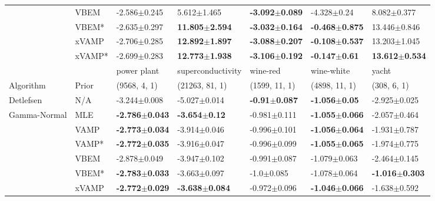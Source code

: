 \begin{tabular}{lllllll}
                 & VBEM &          -2.586$\pm$0.245 &            5.612$\pm$1.465 &  \textbf{-3.092$\pm$0.089} &            -4.328$\pm$0.24 &            8.082$\pm$0.377 \\
                 & VBEM* &          -2.635$\pm$0.297 &  \textbf{11.805$\pm$2.594} &  \textbf{-3.032$\pm$0.164} &  \textbf{-0.468$\pm$0.875} &           13.446$\pm$0.846 \\
                 & xVAMP &          -2.706$\pm$0.285 &  \textbf{12.892$\pm$1.897} &  \textbf{-3.088$\pm$0.207} &  \textbf{-0.108$\pm$0.537} &           13.203$\pm$1.045 \\
                 & xVAMP* &          -2.699$\pm$0.283 &  \textbf{12.773$\pm$1.938} &  \textbf{-3.106$\pm$0.192} &   \textbf{-0.147$\pm$0.61} &  \textbf{13.612$\pm$0.534} \\
\midrule
                 &        &                power plant &          superconductivity &                   wine-red &                 wine-white &                      yacht \\
Algorithm & Prior& (9568, 4, 1)& (21263, 81, 1)& (1599, 11, 1)& (4898, 11, 1)& (308, 6, 1)\\
\midrule
Detlefsen & N/A &           -3.244$\pm$0.008 &           -5.027$\pm$0.014 &   \textbf{-0.91$\pm$0.087} &   \textbf{-1.056$\pm$0.05} &           -2.925$\pm$0.025 \\
Gamma-Normal & MLE &  \textbf{-2.786$\pm$0.043} &   \textbf{-3.654$\pm$0.12} &           -0.981$\pm$0.111 &  \textbf{-1.055$\pm$0.066} &           -2.057$\pm$0.464 \\
                 & VAMP &  \textbf{-2.773$\pm$0.034} &           -3.914$\pm$0.046 &           -0.996$\pm$0.101 &  \textbf{-1.056$\pm$0.064} &           -1.931$\pm$0.787 \\
                 & VAMP* &  \textbf{-2.772$\pm$0.035} &           -3.916$\pm$0.047 &           -0.996$\pm$0.099 &  \textbf{-1.055$\pm$0.065} &           -1.974$\pm$0.775 \\
                 & VBEM &           -2.878$\pm$0.049 &           -3.947$\pm$0.102 &           -0.991$\pm$0.087 &           -1.079$\pm$0.063 &           -2.464$\pm$0.145 \\
                 & VBEM* &  \textbf{-2.783$\pm$0.033} &           -3.663$\pm$0.097 &             -1.0$\pm$0.085 &           -1.078$\pm$0.064 &  \textbf{-1.016$\pm$0.303} \\
                 & xVAMP &  \textbf{-2.772$\pm$0.029} &  \textbf{-3.638$\pm$0.084} &           -0.972$\pm$0.096 &  \textbf{-1.046$\pm$0.066} &           -1.638$\pm$0.592 \\

\end{tabular}
